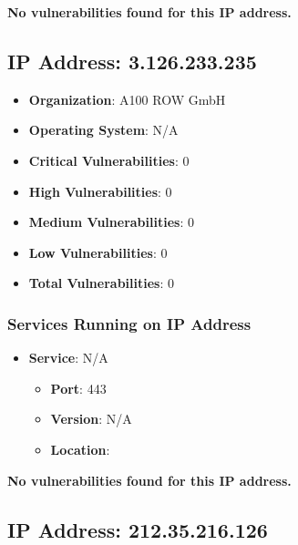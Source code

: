 \documentclass{article}
\begin{document}
\textbf{No vulnerabilities found for this IP address.}




\clearpage



\subsection*{IP Address: 3.126.233.235}

\begin{itemize}
    \item \textbf{Organization}: A100 ROW GmbH
    \item \textbf{Operating System}:  N/A 
    \item \textbf{Critical Vulnerabilities}: 0
    \item \textbf{High Vulnerabilities}: 0
    \item \textbf{Medium Vulnerabilities}: 0
    \item \textbf{Low Vulnerabilities}: 0
    \item \textbf{Total Vulnerabilities}: 0
\end{itemize}

\subsubsection*{Services Running on IP Address}

\begin{itemize}
    
        \item \textbf{Service}: N/A
        \begin{itemize}
            \item \textbf{Port}: 443
            \item \textbf{Version}:  N/A 
            \item \textbf{Location}: \href{  }{  }
        \end{itemize}
    
\end{itemize}


\textbf{No vulnerabilities found for this IP address.}




\clearpage



\subsection*{IP Address: 212.35.216.126}
\end{document}
